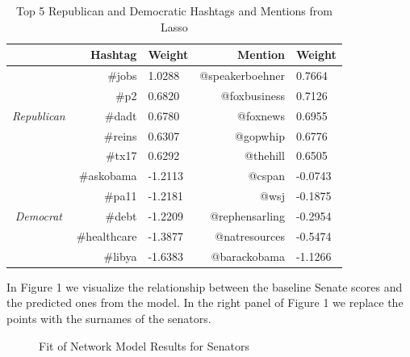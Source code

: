 \documentclass[10pt]{article}
\begin{document}
\begin{table}[!ht]
    \caption{Top 5 Republican and Democratic Hashtags and Mentions from Lasso}
    \centering
    \begin{tabular}{cr|l||r|l}
        & Hashtag & Weight & Mention & Weight \\
        \hline
        \multirow{5}{*}{\emph{Republican}}
        & \#jobs & 1.0288 & @speakerboehner & 0.7664 \\
        & \#p2 & 0.6820 & @foxbusiness & 0.7126 \\
        & \#dadt & 0.6780 & @foxnews & 0.6955 \\
        & \#reins & 0.6307 & @gopwhip & 0.6776 \\
        & \#tx17 & 0.6292 & @thehill & 0.6505 \\
        \hline
        \multirow{5}{*}{\emph{Democrat}}
        & \#askobama & -1.2113 & @cspan & -0.0743 \\
        & \#pa11 & -1.2181 & @wsj & -0.1875 \\
        & \#debt & -1.2209 & @rephensarling & -0.2954 \\
        & \#healthcare & -1.3877 & @natresources & -0.5474 \\
        & \#libya & -1.6383 & @barackobama & -1.1266 \\
        \hline
        \end{tabular}
\end{table}

In Figure 1 we visualize the relationship between the baseline Senate scores and the predicted ones from the model.  In the right panel of Figure 1 we replace the points with the surnames of the senators.

\begin{figure}[!ht]
    \centering
    \caption{Fit of Network Model Results for Senators}
    \label{fig:senators}
\end{figure}
\end{document}
